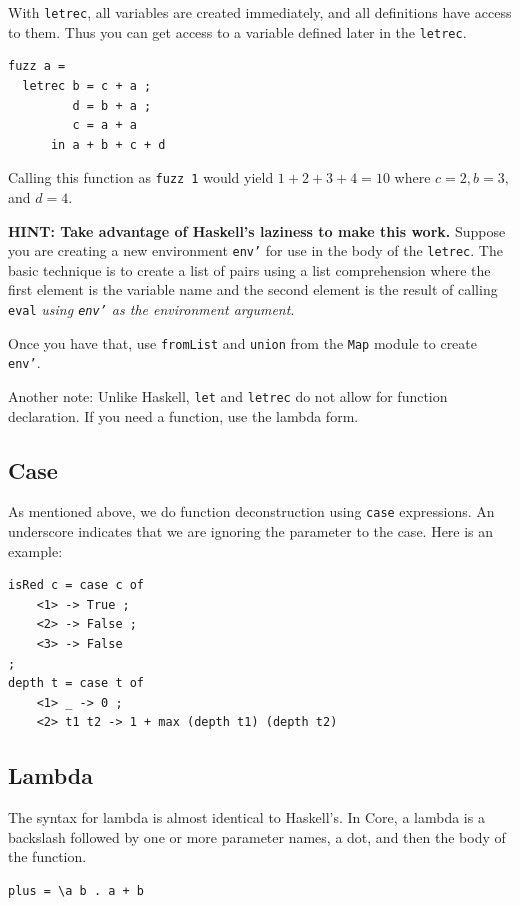 \documentclass[11pt]{article}
\begin{document}
With \texttt{letrec}, all variables are created immediately, and all definitions have access to them.  Thus you can get access to a variable
defined later in the \texttt{letrec}.

\begin{verbatim}
fuzz a =
  letrec b = c + a ;
         d = b + a ;
         c = a + a 
      in a + b + c + d
\end{verbatim}

Calling this function as \texttt{fuzz 1} would yield \(1 + 2 + 3 + 4 = 10\) where \(c = 2, b = 3,\) and \(d = 4\).

\textbf{HINT: Take advantage of Haskell's laziness to make this work.}  Suppose you are creating a new environment \texttt{env'} for
use in the body of the \texttt{letrec}.  The basic technique is to create a list of pairs using a list comprehension where the
first element is the variable name and the second element is the result of calling \texttt{eval}
\emph{using \texttt{env'} as the environment argument}.

Once you have that, use \texttt{fromList} and \texttt{union} from the \texttt{Map} module to create \texttt{env'}.

Another note: Unlike Haskell, \texttt{let} and \texttt{letrec} do not allow for function declaration.  If you need a function, use the lambda form.
\subsection{Case}
\label{sec:org5567001}

As mentioned above, we do function deconstruction using \texttt{case} expressions.  An underscore indicates that we are ignoring the parameter to
the case.  Here is an example:

\begin{verbatim}
isRed c = case c of
    <1> -> True ;
    <2> -> False ;
    <3> -> False
;
depth t = case t of
    <1> _ -> 0 ;
    <2> t1 t2 -> 1 + max (depth t1) (depth t2)
\end{verbatim}
\subsection{Lambda}
\label{sec:org43ddaa1}

The syntax for lambda is almost identical to Haskell's.  In Core, a lambda is a backslash followed by one or more parameter names,
a dot, and then the body of the function.

\begin{verbatim}
plus = \a b . a + b
\end{verbatim}
\end{document}
